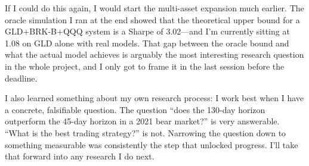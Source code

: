 \documentclass[11pt, letterpaper]{article}
\begin{document}
If I could do this again, I would start the multi-asset expansion much
earlier. The oracle simulation I ran at the end showed that the theoretical
upper bound for a GLD+BRK-B+QQQ system is a Sharpe of 3.02---and I'm
currently sitting at 1.08 on GLD alone with real models. That gap between the
oracle bound and what the actual model achieves is arguably the most
interesting research question in the whole project, and I only got to frame it
in the last session before the deadline.

I also learned something about my own research process: I work best when I
have a concrete, falsifiable question. The question ``does the 130-day horizon
outperform the 45-day horizon in a 2021 bear market?'' is very answerable.
``What is the best trading strategy?'' is not. Narrowing the question down to
something measurable was consistently the step that unlocked progress. I'll
take that forward into any research I do next.
\end{document}
